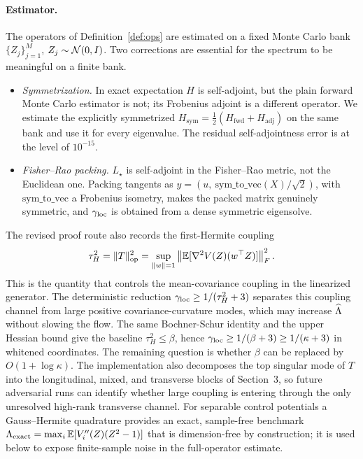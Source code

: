 \documentclass[11pt]{article}
\begin{document}
\paragraph{Estimator.}
The operators of Definition~\ref{def:ops} are estimated on a fixed Monte Carlo
bank $\{Z_j\}_{j=1}^{M}$, $Z_j\sim\mathcal{N}(0,I)$. Two corrections are essential for the
spectrum to be meaningful on a finite bank.
\begin{itemize}\itemsep2pt
  \item \emph{Symmetrization.} In exact expectation $H$ is self-adjoint, but the
  plain forward Monte Carlo estimator is not; its Frobenius adjoint is a
  different operator. We estimate the explicitly symmetrized
  $H_{\mathrm{sym}}=\tfrac12(H_{\mathrm{fwd}}+H_{\mathrm{adj}})$ on the same bank
  and use it for every eigenvalue. The residual self-adjointness error is at the
  level of $10^{-15}$.
  \item \emph{Fisher--Rao packing.} $L_\star$ is self-adjoint in the Fisher--Rao
  metric, not the Euclidean one. Packing tangents as
  $y=(u,\ \mathrm{sym\_to\_vec}(X)/\sqrt2)$, with $\mathrm{sym\_to\_vec}$ a
  Frobenius isometry, makes the packed matrix genuinely symmetric, and $\gamma_{\mathrm{loc}}$ is
  obtained from a dense symmetric eigensolve.
\end{itemize}
The revised proof route also records the first-Hermite coupling
\begin{equation*}
    \tau_H^2=\|T\|_{\mathrm{op}}^2
    =
    \sup_{\|w\|=1}
    \left\|
    \mathbb{E}[\nabla^2 V(Z)(w^\top Z)]
    \right\|_F^2 .
\end{equation*}
This is the quantity that controls the mean-covariance coupling in the
linearized generator. The deterministic reduction
$\gamma_{\mathrm{loc}}\ge 1/(\tau_H^2+3)$ separates this coupling channel from large positive
covariance-curvature modes, which may increase $\widehat{\Lambda}$ without slowing the flow.
The same Bochner-Schur identity and the upper Hessian bound give the baseline
$\tau_H^2\le\beta$, hence $\gamma_{\mathrm{loc}}\ge 1/(\beta+3)\ge 1/(\kappa+3)$ in whitened
coordinates. The remaining question is whether $\beta$ can be replaced by
$O(1+\log\kappa)$.
The implementation also decomposes the top singular mode of $T$ into the
longitudinal, mixed, and transverse blocks of Section~3, so future adversarial
runs can identify whether large coupling is entering through the only unresolved
high-rank transverse channel.
For separable control potentials a Gauss--Hermite quadrature provides an exact,
sample-free benchmark $\Lambda_{\mathrm{exact}}=\max_i\mathbb{E}[V_i''(Z)(Z^2-1)]$ that is
dimension-free by construction; it is used below to expose finite-sample noise in
the full-operator estimate.
\end{document}
